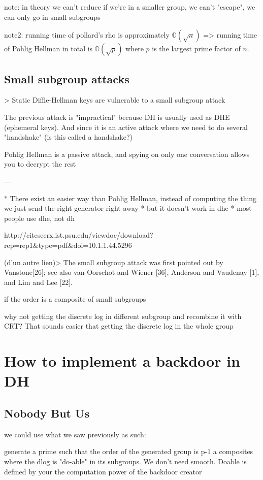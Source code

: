 \documentclass[a4paper,11pt]{article}
\begin{document}
{note: in theory we can't reduce if we're in a smaller group, we can't "escape", we can only go in small subgroups

note2: running time of pollard's rho is approximately $\mathbb{O}(\sqrt{n})$ => running time of Pohlig Hellman in total is $\mathbb{O}(\sqrt{p})$ where $p$ is the largest prime factor of $n$.

\subsection{Small subgroup attacks}

> Static Diffie-Hellman keys are vulnerable to a small subgroup attack

The previous attack is "impractical" because DH is usually used as DHE (ephemeral keys). And since it is an active attack where we need to do several "handshake" (is this called a handshake?)

Pohlig Hellman is a passive attack, and spying on only one conversation allows you to decrypt the rest

---

* There exist an easier way than Pohlig Hellman, instead of computing the thing we just send the right generator right away
* but it doesn't work in dhe
* most people use dhe, not dh

http://citeseerx.ist.psu.edu/viewdoc/download?rep=rep1&type=pdf&doi=10.1.1.44.5296

(d'un autre lien)> The small subgroup attack was first pointed out by Vanstone[26]; see also van Oorschot and Wiener [36], Anderson and Vaudenay [1], and Lim and Lee [22].

if the order is a composite of small subgroups

why not getting the discrete log in different subgroup and recombine it with CRT? That sounds easier that getting the discrete log in the whole group


\section{How to implement a backdoor in DH}

\subsection{Nobody But Us}

we could use what we saw previously as such:

generate a prime such that the order of the generated group is p-1 a composites where the dlog is "do-able" in its subgroups. We don't need smooth. Doable is defined by your the computation power of the backdoor creator

}
\end{document}
